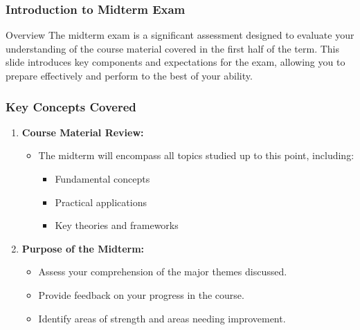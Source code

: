 \documentclass[aspectratio=169]{beamer}
\begin{document}
\frame{\titlepage}

\begin{frame}[fragile]
    \frametitle{Introduction to Midterm Exam}
    \begin{block}{Overview}
        The midterm exam is a significant assessment designed to evaluate your understanding of the course material covered in the first half of the term. This slide introduces key components and expectations for the exam, allowing you to prepare effectively and perform to the best of your ability.
    \end{block}
\end{frame}

\begin{frame}[fragile]
    \frametitle{Key Concepts Covered}
    \begin{enumerate}
        \item \textbf{Course Material Review:}
            \begin{itemize}
                \item The midterm will encompass all topics studied up to this point, including:
                \begin{itemize}
                    \item Fundamental concepts
                    \item Practical applications
                    \item Key theories and frameworks
                \end{itemize}
            \end{itemize}
        \item \textbf{Purpose of the Midterm:}
            \begin{itemize}
                \item Assess your comprehension of the major themes discussed.
                \item Provide feedback on your progress in the course.
                \item Identify areas of strength and areas needing improvement.
            \end{itemize}
    \end{enumerate}
\end{frame}
\end{document}
